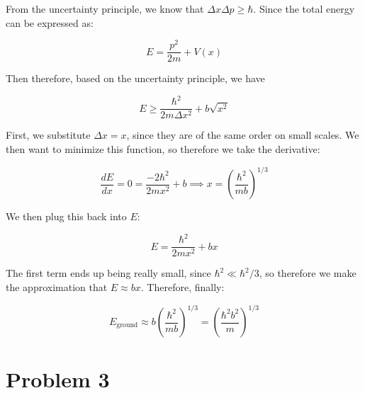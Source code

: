 \documentclass[10pt]{article}
\begin{document}
    \begin{solution}
        From the uncertainty principle, we know that $\Delta x \Delta p \ge \hbar$. Since the total energy can be expressed as: 

        \[ E = \frac{p^2}{2m} + V(x)\] 

        Then therefore, based on the uncertainty principle, we have 

        \[ E \ge \frac{\hbar^2}{2m \Delta x^2} + b \sqrt{x^2}\] 

        First, we substitute $\Delta x = x$, since they are of the same order on small scales. We then want to minimize this function, so therefore we take the derivative: 

        \[ \frac{dE}{dx} = 0 = \frac{-2\hbar^2}{2mx^2} + b \implies x = \left(\frac{\hbar^2}{mb}\right)^{1/3}\] 

        We then plug this back into $E$: 

        \[ E = \frac{\hbar^2}{2mx^2} + bx\] 

        The first term ends up being really small, since $\hbar^2 \ll \hbar^2/3$, so therefore we make the approximation that $E \approx bx$. Therefore, finally: 

        \[ E_{\text{ground}} \approx b\left(\frac{\hbar^2}{mb}\right)^{1/3} = \left(\frac{\hbar^2b^2}{m}\right)^{1/3}\] 
    \end{solution}

    \pagebreak

    \section*{Problem 3}
\end{document}
